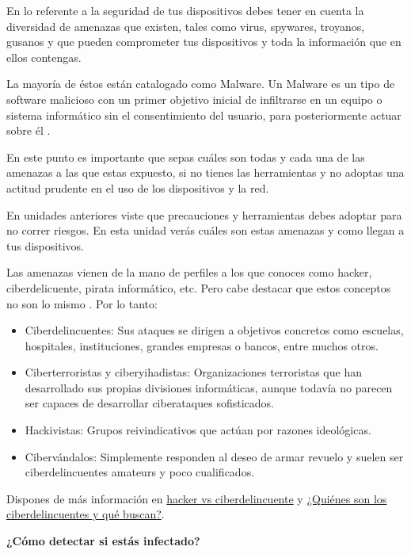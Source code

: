 \documentclass[
  spanish,
  a4paper,
  openany]{book}
\begin{document}
En lo referente a la seguridad de tus dispositivos debes tener en cuenta la diversidad de amenazas que existen, tales como virus, spywares, troyanos, gusanos y que pueden comprometer tus dispositivos y toda la información que en ellos contengas.

La mayoría de éstos están catalogado como Malware. Un Malware es un tipo de software malicioso con un primer objetivo inicial de infiltrarse en un equipo o sistema informático sin el consentimiento del usuario, para posteriormente actuar sobre él \citep{WIKI-malware}.

En este punto es importante que sepas cuáles son todas y cada una de las amenazas a las que estas expuesto, si no tienes las herramientas y no adoptas una actitud prudente en el uso de los dispositivos y la red.

En unidades anteriores viste que precauciones y herramientas debes adoptar para no correr riesgos. En esta unidad verás cuáles son estas amenazas y como llegan a tus dispositivos.

Las amenazas vienen de la mano de perfiles a los que conoces como hacker, ciberdelicuente, pirata informático, etc. Pero cabe destacar que estos conceptos no son lo mismo \citep{OSPI-ciberseguridad-espana}. Por lo tanto:

\begin{itemize}
\item
  Ciberdelincuentes: Sus ataques se dirigen a objetivos concretos como escuelas, hospitales, instituciones, grandes empresas o bancos, entre muchos otros.
\item
  Ciberterroristas y ciberyihadistas: Organizaciones terroristas que han desarrollado sus propias divisiones informáticas, aunque todavía no parecen ser capaces de desarrollar ciberataques sofisticados.
\item
  Hackivistas: Grupos reivindicativos que actúan por razones ideológicas.
\item
  Cibervándalos: Simplemente responden al deseo de armar revuelo y suelen ser ciberdelincuentes amateurs y poco cualificados.
\end{itemize}

Dispones de más información en \href{https://www.incibe.es/aprendeciberseguridad/hacker-vs-ciberdelincuente}{hacker vs ciberdelincuente} y \href{https://www.osi.es/es/campanas/los-ciberdelincuentes-quienes-son/quienes-son-los-ciberdelincuentes-y-que-buscan}{¿Quiénes son los ciberdelincuentes y qué buscan?}.

\textbf{¿Cómo detectar si estás infectado?}
\end{document}
